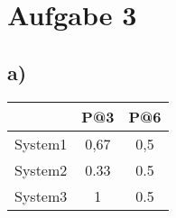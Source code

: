 \section*{Aufgabe 3}

\subsection*{a)}
\begin{center}
\begin{tabular}{|c|c|c|}
\hline & P@3 & P@6\\
\hline System1 & 0,67 & 0,5 \\
\hline System2 & 0.33 & 0.5 \\
\hline System3 & 1 & 0.5 \\
\hline
\end{tabular}
\end{center}